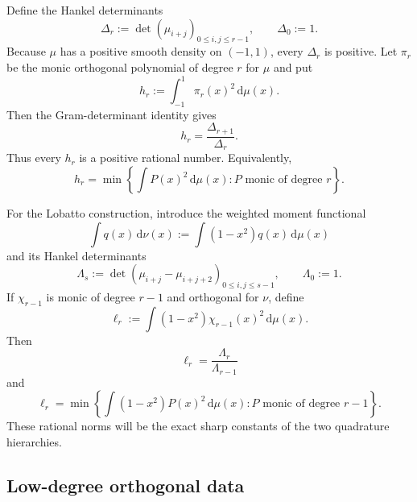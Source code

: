 \documentclass[11pt]{article}
\numberwithin{equation}{section}
\theoremstyle{definition}
\theoremstyle{remark}
\newcommand{\dd}{\,\mathrm d}
\begin{document}
Define the Hankel determinants
\begin{equation}
 \Delta_r:=\det(\mu_{i+j})_{0\le i,j\le r-1},
 \qquad \Delta_0:=1.
 \label{p1:eq:Hankel}
\end{equation}
Because $\mu$ has a positive smooth density on $(-1,1)$, every $\Delta_r$ is positive.  Let $\pi_r$ be the monic orthogonal polynomial of degree $r$ for $\mu$ and put
\begin{equation}
 h_r:=\int_{-1}^{1}\pi_r(x)^2\dd\mu(x).
 \label{p1:eq:hr}
\end{equation}
Then the Gram-determinant identity gives
\begin{equation}
 \boxed{h_r=\frac{\Delta_{r+1}}{\Delta_r}.}
 \label{p1:eq:hr-determinant}
\end{equation}
Thus every $h_r$ is a positive rational number.  Equivalently,
\begin{equation}
 h_r=\min\left\{\int P(x)^2\dd\mu(x):P\text{ monic of degree }r\right\}.
 \label{p1:eq:hr-minimizer}
\end{equation}

For the Lobatto construction, introduce the weighted moment functional
\begin{equation}
 \int q(x)\dd\nu(x):=\int(1-x^2)q(x)\dd\mu(x)
 \label{p1:eq:nu-weighted}
\end{equation}
and its Hankel determinants
\begin{equation}
 \Lambda_s:=\det(\mu_{i+j}-\mu_{i+j+2})_{0\le i,j\le s-1},
 \qquad \Lambda_0:=1.
 \label{p1:eq:Lambda}
\end{equation}
If $\chi_{r-1}$ is monic of degree $r-1$ and orthogonal for $\nu$, define
\begin{equation}
 \ell_r:=\int(1-x^2)\chi_{r-1}(x)^2\dd\mu(x).
 \label{p1:eq:ellr}
\end{equation}
Then
\begin{equation}
 \boxed{\ell_r=\frac{\Lambda_r}{\Lambda_{r-1}}}
 \label{p1:eq:ellr-determinant}
\end{equation}
and
\begin{equation}
 \ell_r=\min\left\{\int(1-x^2)P(x)^2\dd\mu(x):P\text{ monic of degree }r-1\right\}.
 \label{p1:eq:ellr-minimizer}
\end{equation}
These rational norms will be the exact sharp constants of the two quadrature hierarchies.

\subsection{Low-degree orthogonal data}
\end{document}
